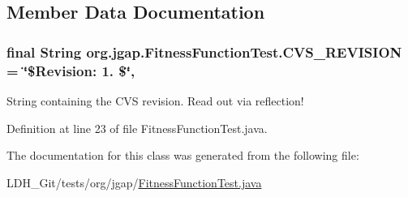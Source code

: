 \subsection{Member Data Documentation}
\hypertarget{classorg_1_1jgap_1_1_fitness_function_test_a8e330c8287f65d72eec1a90d0984b73d}{
\subsubsection[{C\-V\-S\-\_\-\-R\-E\-V\-I\-S\-I\-O\-N}]{\setlength{\rightskip}{0pt plus 5cm}final String org.\-jgap.\-Fitness\-Function\-Test.\-C\-V\-S\-\_\-\-R\-E\-V\-I\-S\-I\-O\-N = \char`\"{}\$Revision\-: 1. \$\char`\"{}\hspace{0.3cm}{\ttfamily [static]}, {\ttfamily [private]}}}\label{classorg_1_1jgap_1_1_fitness_function_test_a8e330c8287f65d72eec1a90d0984b73d}
String containing the C\-V\-S revision. Read out via reflection! 

Definition at line 23 of file Fitness\-Function\-Test.\-java.



The documentation for this class was generated from the following file\-:\begin{DoxyCompactItemize}
\item 
L\-D\-H\-\_\-\-Git/tests/org/jgap/\hyperlink{_fitness_function_test_8java}{Fitness\-Function\-Test.\-java}\end{DoxyCompactItemize}

